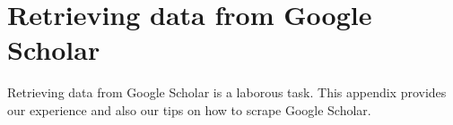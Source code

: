 \section{Retrieving data from Google Scholar}
\label{sec:googlescholar}

Retrieving data from Google Scholar is a laborous task.
This appendix provides our experience and also our tips on how to scrape Google Scholar.
